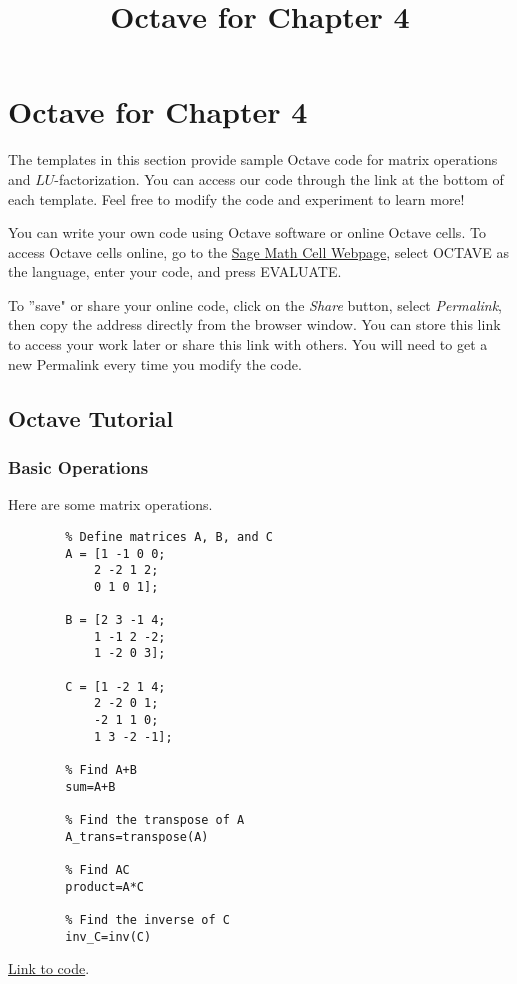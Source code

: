 \documentclass{ximera}
\title{Octave for Chapter 4} \license{CC BY-NC-SA 4.0}
\begin{document}
\begin{abstract}
\end{abstract}
\maketitle

\section*{Octave for Chapter 4}
The templates in this section provide sample Octave code for matrix operations and $LU$-factorization. You can access our code through the link at the bottom of each template.  Feel free to modify the code and experiment to learn more!  

You can write your own code using Octave software or online Octave cells.  To access Octave cells online, go to the \href{https://sagecell.sagemath.org/}{Sage Math Cell Webpage}, select OCTAVE as the language, enter your code, and press EVALUATE.  

To ''save" or share your online code, click on the \emph{Share} button, select \emph{Permalink}, then copy the address directly from the browser window.  You can store this link to access your work later or share this link with others.  You will need to get a new Permalink every time you modify the code.

\subsection*{Octave Tutorial}
\subsubsection*{Basic Operations}

\begin{template}\label{temp:matrixOps}
Here are some matrix operations.
    \begin{verbatim}
        % Define matrices A, B, and C
        A = [1 -1 0 0;
            2 -2 1 2;
            0 1 0 1];
            
        B = [2 3 -1 4;
            1 -1 2 -2;
            1 -2 0 3];   
            
        C = [1 -2 1 4;
            2 -2 0 1;
            -2 1 1 0;
            1 3 -2 -1];     
            
        % Find A+B
        sum=A+B

        % Find the transpose of A
        A_trans=transpose(A)

        % Find AC
        product=A*C

        % Find the inverse of C
        inv_C=inv(C)
    \end{verbatim}
    
    \href{https://sagecell.sagemath.org/?z=eJxdUEsOgyAU3Jtwh9mYaD-JoDvDAml6iaZpjGLqwk-U9vx90GptWRBmhpnhEeJkmrY36Eo7tZWZoQ4oDij7GpoFChIXjiNHgiRnAdwSOApwiAUncDK_LpgFhbMJpM6YLbSPcd4NIciYXnNv-nj1p9JVZD-V1LFgr_Lvk7jrokvcZ23SQpxbGkXtCxbMj076w0rbu4Gdyn4eh9lgaKBo5Jtn5MpHKt5YFP3KOA31o7JS7fRfWNs_zfSOIonQTUvaIx2_APV4TSE=&lang=octave&interacts=eJyLjgUAARUAuQ==}{Link to code}.
    \end{template}
    
\end{document}
